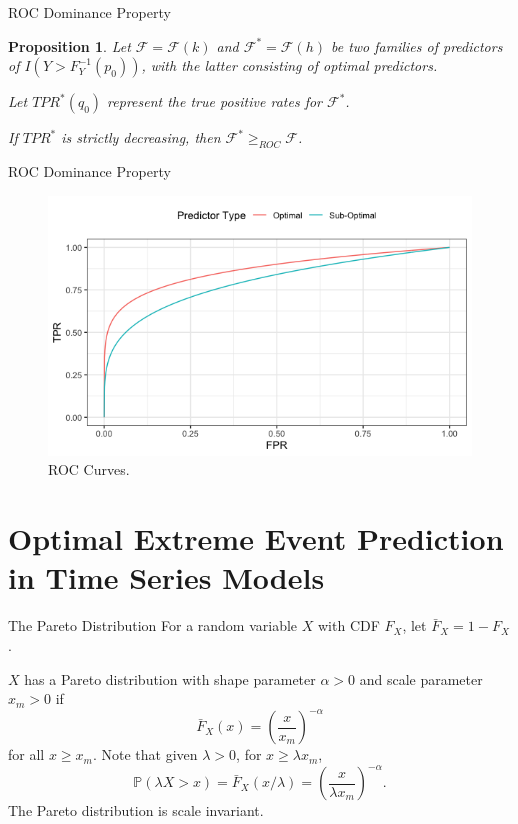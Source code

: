 \documentclass{beamer}
\newtheorem{proposition}{Proposition}
\def\P{\mathbb P}
\begin{document}
\begin{frame}{ROC Dominance Property}
    \begin{proposition}
        Let $\mathcal{F} = \mathcal{F}(k)$ and $\mathcal{F}^* = \mathcal{F}(h)$ be two families of predictors of $I(Y > F_Y^{-1}(p_0))$, with the latter consisting of optimal predictors.

        \medskip
        
        Let $TPR^*(q_0)$ represent the true positive rates for $\mathcal{F}^*$.

        \medskip

        If $TPR^*$ is strictly decreasing, then $\mathcal{F}^* \ge_{ROC} \mathcal{F}$.
    \end{proposition}
\end{frame}

\begin{frame}{ROC Dominance Property}
    \begin{figure}[h!]
        \centering
        \includegraphics[scale=0.4]{roc_curves.png}
        \caption{ROC Curves.}
        \label{fig:roc_curves}
    \end{figure}
\end{frame}

\section{Optimal Extreme Event Prediction in Time Series Models}

\begin{frame}{The Pareto Distribution}
    For a random variable $X$ with CDF $F_X$, let $\bar{F}_X = 1 - F_X$.

    \smallskip
    
    $X$ has a Pareto distribution with shape parameter $\alpha > 0$ and scale parameter $x_m > 0$ if
    \[
    \bar{F}_X(x) = \left(\frac{x}{x_m}\right)^{-\alpha}
    \]
    for all $x \ge x_m$. Note that given $\lambda > 0$, for $x \ge \lambda x_m$,
    \[
    \P(\lambda X > x) = \bar{F}_X(x / \lambda) = \left(\frac{x}{\lambda x_m}\right)^{-\alpha}.
    \]
    The Pareto distribution is scale invariant.
\end{frame}
\end{document}
